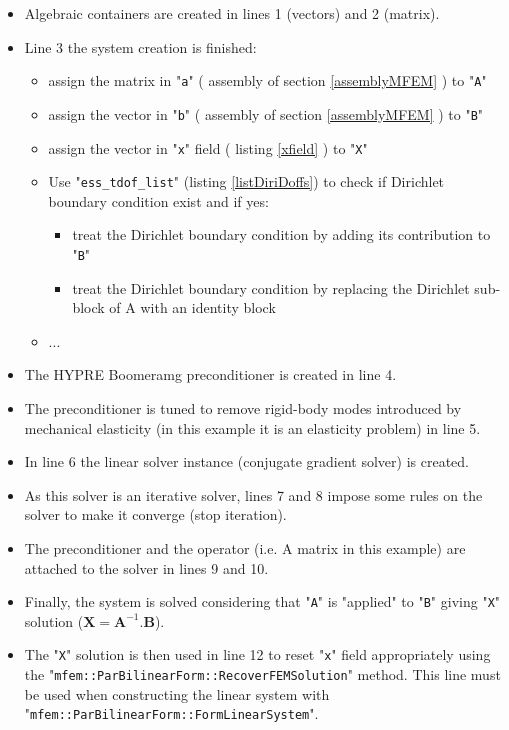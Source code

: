 \documentclass[12pt]{article}
\newcommand{\vm}[1]{
	{\ensuremath{\mathbf{#1}}}
}
\newcommand{\mycode}[1]{\textsf{"}\lstinline`#1`\textsf{"}}
\begin{document}
\begin{itemize}
	\item Algebraic containers are created in lines 1 (vectors) and 2 (matrix).
	\item Line 3 the system creation is finished:
	\begin{itemize}
		\item assign the matrix in \mycode{a} ( assembly of section \ref{assemblyMFEM} ) to \mycode{A}
		\item assign the vector in \mycode{b} ( assembly of section \ref{assemblyMFEM} ) to \mycode{B}
		\item assign the vector in \mycode{x} field ( listing \ref{xfield} ) to \mycode{X}
		\item Use \mycode{ess_tdof_list} (listing \ref{listDiriDoffs}) to check if  Dirichlet boundary condition exist and if yes:
		\begin{itemize}
			\item treat the Dirichlet boundary condition by adding its contribution to \mycode{B}
			\item treat the Dirichlet boundary condition by replacing the Dirichlet sub-block of A with an identity block
		\end{itemize}
		\item  ...
	\end{itemize}
    \item The HYPRE Boomeramg preconditioner is created in line 4.
    \item The preconditioner is tuned to remove rigid-body modes introduced by mechanical elasticity (in this example it is an elasticity problem) in line 5.
    \item In line 6 the linear solver instance (conjugate gradient solver) is created.
    \item As this solver is an iterative solver, lines 7 and 8 impose some rules on the solver to make it converge (stop iteration).
    \item The preconditioner and the operator (i.e. A matrix in this example) are attached to the solver in lines 9 and 10.
    \item Finally, the system is solved considering that \mycode{A} is "applied" to \mycode{B} giving \mycode{X} solution ($\vm{X}=\vm{A}^{-1}.\vm{B}$).
    \item The \mycode{X} solution is then used in line 12 to reset \mycode{x} field appropriately using the \mycode{mfem::ParBilinearForm::RecoverFEMSolution} method. This line must be used when constructing the linear system with \mycode{mfem::ParBilinearForm::FormLinearSystem}. 
\end{itemize} 
\end{document}

